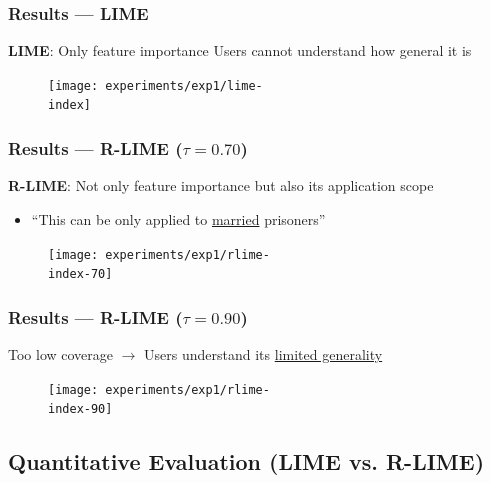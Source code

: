 \documentclass[aspectratio=169]{slide-en}
\begin{document}
{%
\def\scale{0.42}

\subsubsection{Results --- LIME}
\begin{frame}{}
  \textbf{LIME}\@: Only feature importance \textrightarrow{}
  Users cannot understand how general it is
  \bigskip
  \begin{figure}[b]
    \hspace{-4em}
    \texttt{[image: experiments/exp1/lime-\\index]}
  \end{figure}
\end{frame}

\subsubsection{Results --- R-LIME ($\tau=0.70$)}
\begin{frame}{}
  \textbf{R-LIME}\@: Not only feature importance but also its application scope

  \begin{itemize}
    \item ``This can be only applied to \underline{married} prisoners''
  \end{itemize}
  \begin{figure}
    \hspace{-3.7em}
    \texttt{[image: experiments/exp1/rlime-\\index-70]}
  \end{figure}
\end{frame}

\subsubsection{Results --- R-LIME ($\tau=0.90$)}
\begin{frame}{}
  Too low coverage $\rightarrow$ Users understand its \underline{limited generality}
  \begin{figure}
    \hspace{-4.5em}
    \texttt{[image: experiments/exp1/rlime-\\index-90]}
  \end{figure}
\end{frame}
}

\subsection{Quantitative Evaluation (LIME vs. R-LIME)}
\end{document}

